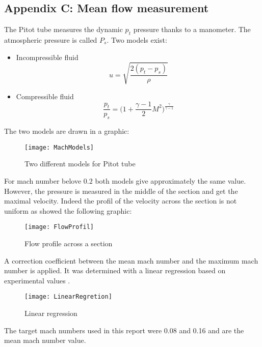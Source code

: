 \subsection*{Appendix C: Mean flow measurement}\label{sec:AppendixC}
The Pitot tube measures the dynamic $p_t$ pressure thanks to a manometer. The atmospheric pressure is called $P_s$.
Two models exist:
\begin{itemize}
    \item Incompressible fluid
        \begin{equation}
        u = \sqrt{\frac{2(p_t-p_s)}{\rho}}         
        \end{equation}
        \item Compressible fluid
        \begin{equation}
        \frac{p_t}{p_s} = \Big(1+\frac{\gamma-1}{2}  M^2\Big)^{\frac{\gamma}{\gamma-1}}    
        \end{equation}
\end{itemize}
The two models are drawn in a graphic:
\begin{figure}[H] \centering
    \texttt{[image: MachModels]}
    \caption{Two different models for Pitot tube}
\end{figure}
\noindent For mach number belove $0.2$ both models give approximately the same value.\\
However, the pressure is measured in the middle of the section and get the maximal velocity. Indeed the profil of the velocity across the section is not uniform as showed the following graphic:
\begin{figure}[H] \centering
    \texttt{[image: FlowProfil]}
    \caption{Flow profile across a section \cite{Zhou_thesis}}
\end{figure}
\noindent A correction coefficient between the mean mach number and the maximum mach number is applied. It was determined with a linear regression based on experimental values \cite{Zhou_thesis}.
\begin{figure}[H] \centering
    \texttt{[image: LinearRegretion]}
    \caption{Linear regression}
\end{figure}
The target mach numbers used in this report were 0.08 and 0.16 and are the mean mach number value.
